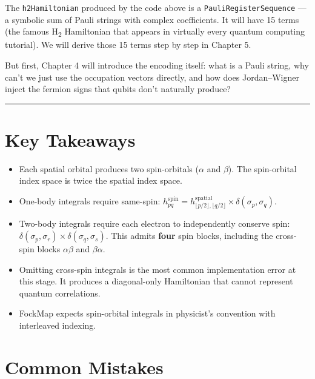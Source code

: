 \documentclass[
  11pt,
  oneside]{book}
\providecommand{\tightlist}{%
  \setlength{\itemsep}{0pt}\setlength{\parskip}{0pt}}
\begin{document}
The \texttt{h2Hamiltonian} produced by the code above is a
\texttt{PauliRegisterSequence} --- a symbolic sum of Pauli strings with
complex coefficients. It will have 15 terms (the famous H\textsubscript{2} Hamiltonian
that appears in virtually every quantum computing tutorial). We will
derive those 15 terms step by step in Chapter 5.

But first, Chapter 4 will introduce the encoding itself: what is a Pauli
string, why can't we just use the occupation vectors directly, and how
does Jordan--Wigner inject the fermion signs that qubits don't naturally
produce?

\begin{center}\rule{0.5\linewidth}{0.5pt}\end{center}

\section{Key Takeaways}\label{key-takeaways-2}

\begin{itemize}
\tightlist
\item
  Each spatial orbital produces two spin-orbitals (\(\alpha\) and
  \(\beta\)). The spin-orbital index space is twice the spatial index
  space.
\item
  One-body integrals require same-spin:
  \(h^{\text{spin}}_{pq} = h^{\text{spatial}}_{\lfloor p/2 \rfloor, \lfloor q/2 \rfloor} \times \delta(\sigma_p, \sigma_q)\).
\item
  Two-body integrals require each electron to independently conserve
  spin:
  \(\delta(\sigma_p, \sigma_r) \times \delta(\sigma_q, \sigma_s)\). This
  admits \textbf{four} spin blocks, including the cross-spin blocks
  \(\alpha\beta\) and \(\beta\alpha\).
\item
  Omitting cross-spin integrals is the most common implementation error
  at this stage. It produces a diagonal-only Hamiltonian that cannot
  represent quantum correlations.
\item
  FockMap expects spin-orbital integrals in physicist's convention with
  interleaved indexing.
\end{itemize}

\section{Common Mistakes}\label{common-mistakes-2}
\end{document}
